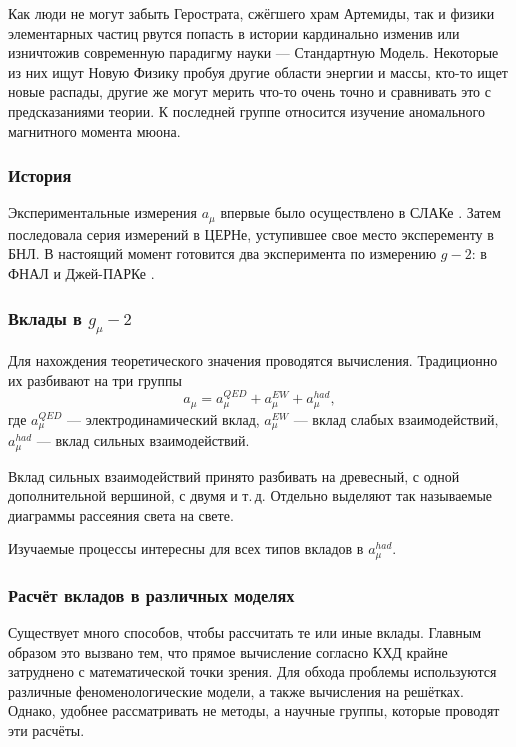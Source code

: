 Как люди не могут забыть Герострата, сжёгшего храм Артемиды, так и физики
элементарных частиц рвутся попасть в истории кардинально изменив или
изничтожив современную парадигму науки --- Стандартную Модель. Некоторые
из них ищут Новую Физику пробуя другие области энергии и массы, кто-то
ищет новые распады, другие же могут мерить что-то очень точно и
сравнивать это с предсказаниями теории. К последней группе относится
изучение аномального магнитного момента мюона.

\subsubsection{История}\label{g-2-history}

Экспериментальные измерения $a_\mu$ впервые было осуществлено в СЛАКе \cite{Garwin:1960zz}.
Затем последовала серия измерений в ЦЕРНе, уступившее свое место эксперементу в БНЛ.
В настоящий момент готовится два эксперимента по измерению $g-2$: в ФНАЛ \cite{Grange:2015fou} и Джей-ПАРКе \cite{Saito:2012zz}.

\subsubsection{Вклады в \texorpdfstring{$g_\mu-2$}{muon g-2}}
\label{contribution-to-g-2}

Для нахождения теоретического значения проводятся вычисления.
Традиционно их разбивают на три группы
\begin{equation}
    a_\mu = a_\mu^{QED} + a_\mu^{EW} + a_\mu^{had},
\end{equation}
где $a_\mu^{QED}$ --- электродинамический вклад, $a_\mu^{EW}$ --- вклад
слабых взаимодействий, $a_\mu^{had}$ --- вклад сильных взаимодействий.

Вклад сильных взаимодействий принято разбивать на древесный, с одной
дополнительной вершиной, с двумя и т.\,д.
Отдельно выделяют так называемые
диаграммы рассеяния света на свете.

Изучаемые процессы интересны для всех типов вкладов в $a_\mu^{had}$. 

\subsubsection{Расчёт вкладов в различных
моделях}\label{contribution-calculation}

Существует много способов, чтобы рассчитать те или иные вклады. Главным
образом это вызвано тем, что прямое вычисление согласно КХД крайне
затруднено с математической точки зрения. Для обхода проблемы
используются различные феноменологические модели, а также вычисления на
решётках. Однако, удобнее рассматривать не методы, а научные группы,
которые проводят эти расчёты.


